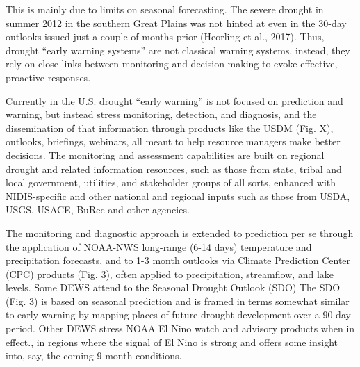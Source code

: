 \documentclass[11pt]{article}
\begin{document}
This is mainly due to limits on seasonal forecasting. 
The severe drought in summer 2012 in the southern Great Plains was not hinted at even in the 30-day outlooks issued just a couple of months prior (Heorling et al., 2017). 
Thus, drought ``early warning systems'' are not classical warning systems, instead, they rely on close links between monitoring and decision-making to evoke effective, proactive responses. 

Currently in the U.S. drought ``early warning'' is not focused on prediction and warning, but instead stress monitoring, detection, and diagnosis, and the dissemination of that information through products like the USDM (Fig. X), outlooks, briefings, webinars, all meant to help resource managers make better decisions. 
The monitoring and assessment capabilities are built on regional drought and related information resources, such as those from state, tribal and local government,  utilities, and stakeholder groups of all sorts, enhanced with NIDIS-specific and other national and regional inputs such as those from USDA, USGS, USACE, BuRec and other agencies. 

The monitoring and diagnostic approach is extended to prediction per se through the application of  NOAA-NWS long-range (6-14 days) temperature and precipitation forecasts, and to 1-3 month outlooks via Climate Prediction Center (CPC) products (Fig. 3), often applied to precipitation, streamflow, and lake levels. Some DEWS attend to the Seasonal Drought Outlook (SDO)%
 The SDO (Fig. 3)
 is based on seasonal prediction and is framed in terms somewhat similar to early warning by mapping places of future drought development over a 90 day period. Other DEWS stress NOAA El Nino watch and advisory products when in effect., in regions where the signal of El Nino is strong and offers some insight into, say, the coming 9-month conditions. 
\end{document}
